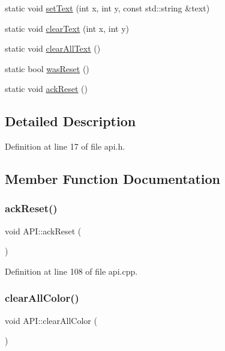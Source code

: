 \begin{DoxyCompactItemize}
static void \hyperlink{class_a_p_i_a25a489520b0b69b7a0b1870cf350f654}{set\+Text} (int x, int y, const std\+::string \&text)
\item 
static void \hyperlink{class_a_p_i_a0937e059fff7d9543187765500fa4968}{clear\+Text} (int x, int y)
\item 
static void \hyperlink{class_a_p_i_a212ef41a4d954a80cd08f462fdb9f631}{clear\+All\+Text} ()
\item 
static bool \hyperlink{class_a_p_i_ab754e11300491d9efee2da2eda368d93}{was\+Reset} ()
\item 
static void \hyperlink{class_a_p_i_a3e6a76df2da89bd7f7fc72a96e0a9094}{ack\+Reset} ()
\end{DoxyCompactItemize}


\subsection{Detailed Description}


Definition at line 17 of file api.\+h.



\subsection{Member Function Documentation}
\mbox{\label{class_a_p_i_a3e6a76df2da89bd7f7fc72a96e0a9094}} 
\subsubsection{\texorpdfstring{ack\+Reset()}{ackReset()}}
{\footnotesize\ttfamily void A\+P\+I\+::ack\+Reset (\begin{DoxyParamCaption}{ }\end{DoxyParamCaption})\hspace{0.3cm}{\ttfamily [static]}}



Definition at line 108 of file api.\+cpp.

\mbox{\label{class_a_p_i_a26cc8c35d6c492fc782647b7e347525e}} 
\subsubsection{\texorpdfstring{clear\+All\+Color()}{clearAllColor()}}
{\footnotesize\ttfamily void A\+P\+I\+::clear\+All\+Color (\begin{DoxyParamCaption}{ }\end{DoxyParamCaption})\hspace{0.3cm}{\ttfamily [static]}}



